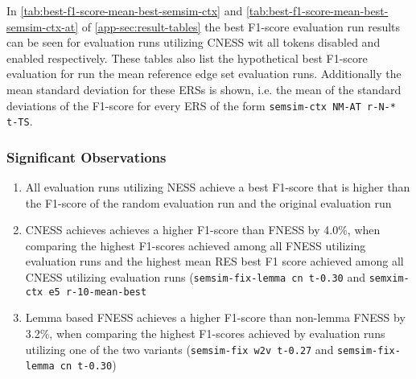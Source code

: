 \documentclass[11pt]{scrreprt}
\begin{document}
In \cref{tab:best-f1-score-mean-best-semsim-ctx} and \cref{tab:best-f1-score-mean-best-semsim-ctx-at} of \cref{app-sec:result-tables} the best F1-score evaluation run results can be seen for evaluation runs utilizing CNESS wit all tokens disabled and enabled respectively. These tables also list the hypothetical best F1-score evaluation for run the mean reference edge set evaluation runs. Additionally the mean standard deviation for these ERSs is shown, i.e. the mean of the standard deviations of the F1-score for every ERS of the form \texttt{semsim-ctx NM-AT r-N-* t-TS}.


\subsubsection{Significant Observations}
\begin{enumerate}
	\item All evaluation runs utilizing NESS achieve a best F1-score that is higher than the F1-score of the random evaluation run and the original evaluation run
	\item CNESS achieves achieves a higher F1-score than FNESS by 4.0\%, when comparing the highest F1-scores achieved among all FNESS utilizing evaluation runs and the highest mean RES best F1 score achieved among all CNESS utilizing evaluation runs (\texttt{semsim-fix-lemma cn t-0.30} and \texttt{semxim-ctx e5 r-10-mean-best} 
	\item Lemma based FNESS achieves a higher F1-score than non-lemma FNESS by 3.2\%, when comparing the highest F1-scores achieved by evaluation runs utilizing one of the two variants (\texttt{semsim-fix w2v t-0.27} and \texttt{semsim-fix-lemma cn t-0.30})


\end{enumerate}
\end{document}
